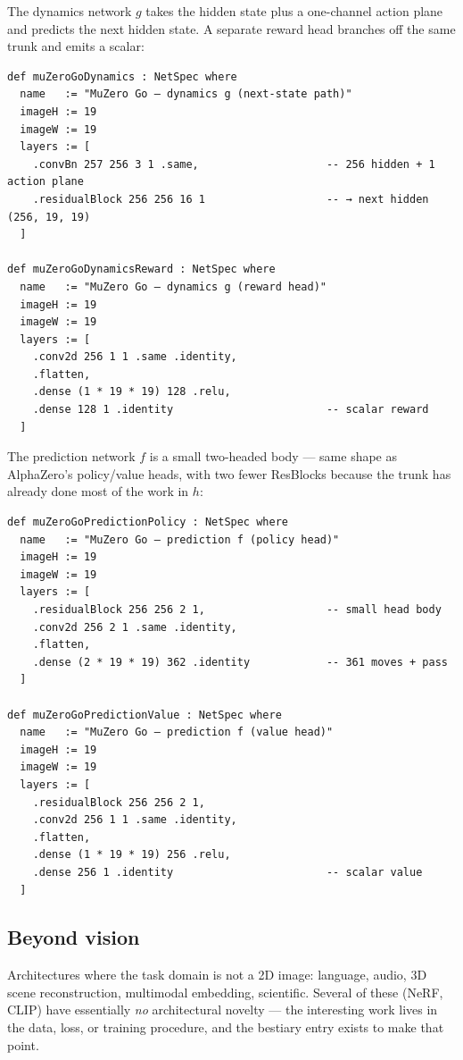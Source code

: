 The dynamics network $g$ takes the hidden state plus a one-channel
action plane and predicts the next hidden state. A separate reward
head branches off the same trunk and emits a scalar:

\begin{verbatim}
def muZeroGoDynamics : NetSpec where
  name   := "MuZero Go — dynamics g (next-state path)"
  imageH := 19
  imageW := 19
  layers := [
    .convBn 257 256 3 1 .same,                    -- 256 hidden + 1 action plane
    .residualBlock 256 256 16 1                   -- → next hidden (256, 19, 19)
  ]

def muZeroGoDynamicsReward : NetSpec where
  name   := "MuZero Go — dynamics g (reward head)"
  imageH := 19
  imageW := 19
  layers := [
    .conv2d 256 1 1 .same .identity,
    .flatten,
    .dense (1 * 19 * 19) 128 .relu,
    .dense 128 1 .identity                        -- scalar reward
  ]
\end{verbatim}

The prediction network $f$ is a small two-headed body --- same shape
as AlphaZero's policy/value heads, with two fewer ResBlocks because
the trunk has already done most of the work in $h$:

\begin{verbatim}
def muZeroGoPredictionPolicy : NetSpec where
  name   := "MuZero Go — prediction f (policy head)"
  imageH := 19
  imageW := 19
  layers := [
    .residualBlock 256 256 2 1,                   -- small head body
    .conv2d 256 2 1 .same .identity,
    .flatten,
    .dense (2 * 19 * 19) 362 .identity            -- 361 moves + pass
  ]

def muZeroGoPredictionValue : NetSpec where
  name   := "MuZero Go — prediction f (value head)"
  imageH := 19
  imageW := 19
  layers := [
    .residualBlock 256 256 2 1,
    .conv2d 256 1 1 .same .identity,
    .flatten,
    .dense (1 * 19 * 19) 256 .relu,
    .dense 256 1 .identity                        -- scalar value
  ]
\end{verbatim}

\subsection{Beyond vision}

Architectures where the task domain is not a 2D image: language,
audio, 3D scene reconstruction, multimodal embedding, scientific.
Several of these (NeRF, CLIP) have essentially \emph{no} architectural
novelty --- the interesting work lives in the data, loss, or training
procedure, and the bestiary entry exists to make that point.

